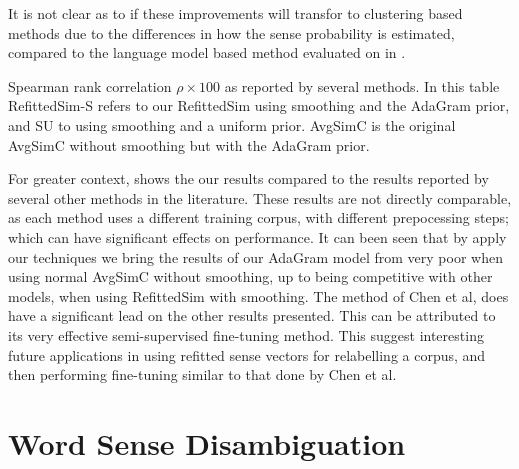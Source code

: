 \documentclass{sig-alternate}
\begin{document}
It is not clear as to if these improvements will transfor to clustering based methods due to the differences in how the sense probability is estimated, compared to the language model based method evaluated on in .

\begin{table}
	\begin{adjustbox}{max width=\columnwidth}
	\end{adjustbox}
	\caption{Spearman rank correlation $\rho \times 100$  as reported by several methods\label{swscEvery}. In this table RefittedSim-S refers to our RefittedSim using smoothing and the AdaGram prior, and SU to using smoothing and a uniform prior. AvgSimC is the original AvgSimC without smoothing but with the AdaGram prior.}
\end{table}

For greater context,  shows the our results compared to the results reported by several other methods in the literature. These results are not directly comparable, as each method uses a different training corpus, with different prepocessing steps;  which can have significant effects on performance.
It can been seen that by apply our techniques we bring the results of our AdaGram model from very poor when using normal AvgSimC without smoothing, up to being competitive with other models, when using RefittedSim with smoothing. The method of Chen et al, does have a significant lead on the other results presented\parencite{Chen2014}. This can be attributed to its very effective semi-supervised fine-tuning method. This suggest interesting future applications in using refitted sense vectors for relabelling a corpus, and then performing fine-tuning similar to that done by Chen et al.



\section{Word Sense Disambiguation}
\end{document}
